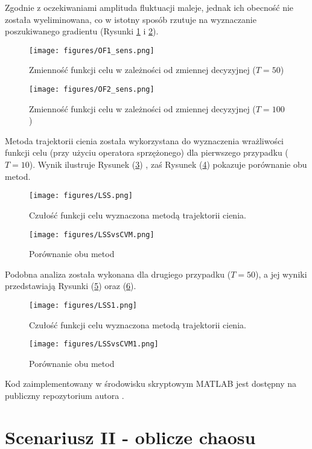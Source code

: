 \documentclass[12pt, twoside]{book}
\begin{document}
Zgodnie z oczekiwaniami amplituda fluktuacji maleje, jednak ich obecność nie została wyeliminowana, co w istotny sposób rzutuje na wyznaczanie poszukiwanego gradientu (Rysunki \ref{Fig20} i \ref{Fig21}).
\begin{figure}[hp]
	\texttt{[image: figures/OF1\_sens.png]} 
	\centering
	\caption{Zmienność funkcji celu w zależności od zmiennej decyzyjnej ($ T=50 $)}
	\label{Fig20}
\end{figure}
\begin{figure}[hp]
	\texttt{[image: figures/OF2\_sens.png]} 
	\centering
	\caption{Zmienność funkcji celu w zależności od zmiennej decyzyjnej ($ T=100 $)}
	\label{Fig21}
\end{figure}
Metoda trajektorii cienia została wykorzystana do wyznaczenia wrażliwości funkcji celu (przy użyciu operatora sprzężonego) dla pierwszego przypadku ($ T=10 $). Wynik ilustruje Rysunek (\ref{Fig22}) , zaś Rysunek (\ref{Fig23}) pokazuje porównanie obu metod.
\begin{figure}[hp]
	\texttt{[image: figures/LSS.png]} 
	\centering
	\caption{Czułość funkcji celu wyznaczona metodą trajektorii cienia.}
	\label{Fig22}
\end{figure}
\begin{figure}[hp]
	\texttt{[image: figures/LSSvsCVM.png]} 
	\centering
	\caption{Porównanie obu metod}
	\label{Fig23}
\end{figure}
Podobna analiza została wykonana dla drugiego przypadku ($ T=50 $), a jej wyniki przedstawiają Rysunki (\ref{Fig24}) oraz (\ref{Fig25}).
\begin{figure}[hp]
	\texttt{[image: figures/LSS1.png]} 
	\centering
	\caption{Czułość funkcji celu wyznaczona metodą trajektorii cienia.}
	\label{Fig24}
\end{figure}
\begin{figure}[hp]
	\texttt{[image: figures/LSSvsCVM1.png]}
	\centering
	\caption{Porównanie obu metod}
	\label{Fig25}
\end{figure}
Kod zaimplementowany w środowisku skryptowym MATLAB jest dostępny na publiczny repozytorium autora \cite{Marek1}.
\section{Scenariusz II - oblicze chaosu}
\end{document}
